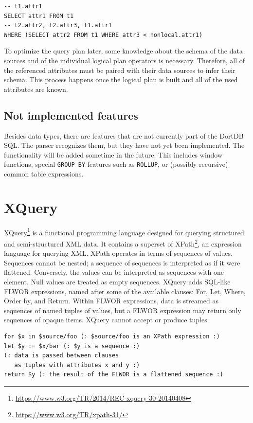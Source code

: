 \begin{verbatim}
-- t1.attr1
SELECT attr1 FROM t1
-- t2.attr2, t2.attr3, t1.attr1
WHERE (SELECT attr2 FROM t1 WHERE attr3 < nonlocal.attr1)
\end{verbatim}

To optimize the query plan later, some knowledge about the schema of the data sources and of the individual logical plan operators is necessary. Therefore, all of the referenced attributes must be paired with their data sources to infer their schema. This process happens once the logical plan is built and all of the used attributes are known.

\subsection{Not implemented features}

Besides data types, there are features that are not currently part of the DortDB SQL. The parser recognizes them, but they have not yet been implemented. The functionality will be added sometime in the future. This includes window functions, special \texttt{GROUP BY} features such as \texttt{ROLLUP}, or (possibly recursive) common table expressions.

\section{XQuery}

XQuery\footnote{\url{https://www.w3.org/TR/2014/REC-xquery-30-20140408}} is a functional programming language designed for querying structured and semi-structured XML data. It contains a superset of XPath\footnote{\url{https://www.w3.org/TR/xpath-31/}}, an expression language for querying XML. XPath operates in terms of sequences of values. Sequences cannot be nested; a sequence of sequences is interpreted as if it were flattened. Conversely, the values can be interpreted as sequences with one element. Null values are treated as empty sequences. XQuery adds SQL-like FLWOR expressions, named after some of the available clauses: For, Let, Where, Order by, and Return. Within FLWOR expressions, data is streamed as sequences of named tuples of values, but a FLWOR expression may return only sequences of opaque items. XQuery cannot accept or produce tuples.

\begin{verbatim}
for $x in $source/foo (: $source/foo is an XPath expression :)
let $y := $x/bar (: $y is a sequence :)
(: data is passed between clauses
   as tuples with attributes x and y :)
return $y (: the result of the FLWOR is a flattened sequence :)
\end{verbatim}

